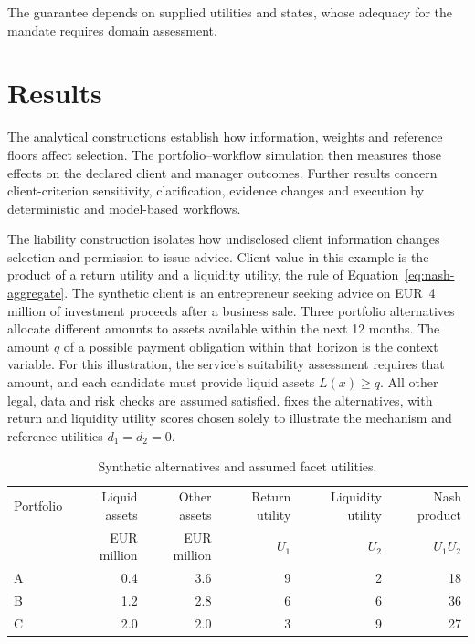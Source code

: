\documentclass[oneside,10pt,english]{swissi}
\begin{document}
The guarantee depends on supplied utilities and states, whose adequacy for the mandate requires domain assessment.

\section{Results}\label{sec:results}

The analytical constructions establish how information, weights and reference floors affect selection. The portfolio--workflow simulation then measures those effects on the declared client and manager outcomes. Further results concern client-criterion sensitivity, clarification, evidence changes and execution by deterministic and model-based workflows.

The liability construction isolates how undisclosed client information changes selection and permission to issue advice. Client value in this example is the product of a return utility and a liquidity utility, the rule of Equation~\eqref{eq:nash-aggregate}. The synthetic client is an entrepreneur seeking advice on EUR~4 million of investment proceeds after a business sale. Three portfolio alternatives allocate different amounts to assets available within the next 12 months. The amount $q$ of a possible payment obligation within that horizon is the context variable. For this illustration, the service's suitability assessment requires that amount, and each candidate must provide liquid assets $L(x)\ge q$. All other legal, data and risk checks are assumed satisfied.  fixes the alternatives, with return and liquidity utility scores chosen solely to illustrate the mechanism and reference utilities $d_1=d_2=0$.

\begin{table}[htbp]
\centering
\caption{Synthetic alternatives and assumed facet utilities.}
\label{tab:worked-case}
\small
\begin{tabular*}{\textwidth}{@{\extracolsep{\fill}}lrrrrr@{}}
\toprule
Portfolio & Liquid assets & Other assets & Return utility & Liquidity utility & Nash product \\
 & EUR million & EUR million & $U_1$ & $U_2$ & $U_1U_2$ \\
\midrule
A & 0.4 & 3.6 & 9 & 2 & 18 \\
B & 1.2 & 2.8 & 6 & 6 & 36 \\
C & 2.0 & 2.0 & 3 & 9 & 27 \\
\bottomrule
\end{tabular*}
\end{table}
\end{document}

